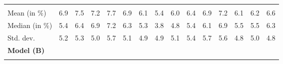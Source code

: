 \begin{tabular}{lllllllllllllll}
  \multicolumn{1}{|r}{} &
  \multicolumn{1}{r}{} &
  \multicolumn{1}{r}{} &
  \multicolumn{1}{r}{} &
  \multicolumn{1}{r}{} &
  \multicolumn{1}{r}{} &
  \multicolumn{1}{r}{} &
  \multicolumn{1}{r}{} &
  \multicolumn{1}{r}{} &
  \multicolumn{1}{r}{} &
  \multicolumn{1}{r}{} &
  \multicolumn{1}{r}{} &
  \multicolumn{1}{r}{} &
  \multicolumn{1}{r}{} \\
\multicolumn{1}{l}{\hspace{2em}Mean (in $\%$)} &
  \multicolumn{1}{|r}{6.9} &
  \multicolumn{1}{r}{7.5} &
  \multicolumn{1}{r}{7.2} &
  \multicolumn{1}{r}{7.7} &
  \multicolumn{1}{r}{6.9} &
  \multicolumn{1}{r}{6.1} &
  \multicolumn{1}{r}{5.4} &
  \multicolumn{1}{r}{6.0} &
  \multicolumn{1}{r}{6.4} &
  \multicolumn{1}{r}{6.9} &
  \multicolumn{1}{r}{7.2} &
  \multicolumn{1}{r}{6.1} &
  \multicolumn{1}{r}{6.2} &
  \multicolumn{1}{r}{6.6} \\
\multicolumn{1}{l}{\hspace{2em}Median (in $\%$)} &
  \multicolumn{1}{|r}{5.4} &
  \multicolumn{1}{r}{6.4} &
  \multicolumn{1}{r}{6.9} &
  \multicolumn{1}{r}{7.2} &
  \multicolumn{1}{r}{6.3} &
  \multicolumn{1}{r}{5.3} &
  \multicolumn{1}{r}{3.8} &
  \multicolumn{1}{r}{4.8} &
  \multicolumn{1}{r}{5.4} &
  \multicolumn{1}{r}{6.1} &
  \multicolumn{1}{r}{6.9} &
  \multicolumn{1}{r}{5.5} &
  \multicolumn{1}{r}{5.5} &
  \multicolumn{1}{r}{6.3} \\
\multicolumn{1}{l}{\hspace{2em}Std. dev.} &
  \multicolumn{1}{|r}{5.2} &
  \multicolumn{1}{r}{5.3} &
  \multicolumn{1}{r}{5.0} &
  \multicolumn{1}{r}{5.7} &
  \multicolumn{1}{r}{5.1} &
  \multicolumn{1}{r}{4.9} &
  \multicolumn{1}{r}{4.9} &
  \multicolumn{1}{r}{5.1} &
  \multicolumn{1}{r}{5.4} &
  \multicolumn{1}{r}{5.7} &
  \multicolumn{1}{r}{5.6} &
  \multicolumn{1}{r}{4.8} &
  \multicolumn{1}{r}{5.0} &
  \multicolumn{1}{r}{4.8} \\
\multicolumn{1}{l}{{\textbf{Model (B)}}} &
  \multicolumn{1}{|r}{} &
  \multicolumn{1}{r}{} &
  \multicolumn{1}{r}{} &
  \multicolumn{1}{r}{} &
  \multicolumn{1}{r}{} &
  \multicolumn{1}{r}{} &
  \multicolumn{1}{r}{} &
  \multicolumn{1}{r}{} &
  \multicolumn{1}{r}{} &
  \multicolumn{1}{r}{} &
  \multicolumn{1}{r}{} &
  \multicolumn{1}{r}{} &
  \multicolumn{1}{r}{} &
  \multicolumn{1}{r}{} \\
\multicolumn{1}{l}{\hspace{1em}{\textit{Mult. term} ($\widehat{\tau}^{adv}$)}} &
  \multicolumn{1}{|r}{} &
  \multicolumn{1}{r}{} &
  \multicolumn{1}{r}{} &
  \multicolumn{1}{r}{} &

\end{tabular}
